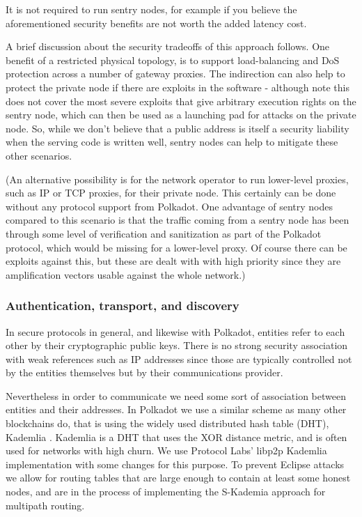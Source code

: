 It is not required to run sentry nodes, for example if you believe the
aforementioned security benefits are not worth the added latency cost.

A brief discussion about the security tradeoffs of this approach follows. One
benefit of a restricted physical topology, is to support load-balancing and DoS
protection across a number of gateway proxies. The indirection can also help to
protect the private node if there are exploits in the software - although note
this does not cover the most severe exploits that give arbitrary execution
rights on the sentry node, which can then be used as a launching pad for
attacks on the private node. So, while we don't believe that a public address
is itself a security liability when the serving code is written well, sentry
nodes can help to mitigate these other scenarios.

(An alternative possibility is for the network operator to run lower-level
proxies, such as IP or TCP proxies, for their private node. This certainly can
be done without any protocol support from Polkadot. One advantage of sentry
nodes compared to this scenario is that the traffic coming from a sentry node
has been through some level of verification and sanitization as part of the
Polkadot protocol, which would be missing for a lower-level proxy. Of course
there can be exploits against this, but these are dealt with with high priority
since they are amplification vectors usable against the whole network.)

\subsubsection{Authentication, transport, and discovery} \label{sec:net_lowlevel}

In secure protocols in general, and likewise with Polkadot, entities refer to each other by their cryptographic public keys. There is no strong security association with weak references such as IP addresses since those are typically controlled not by the entities themselves but by their communications provider.

Nevertheless in order to communicate we need some sort of association between entities and their addresses. In Polkadot we use a similar scheme as many other blockchains do, that is using the widely used distributed hash table (DHT), Kademlia \cite{Maymounkov:2002:Kademila}. Kademlia is a DHT that uses the XOR distance metric, and is often used for networks with high churn. We use Protocol Labs' libp2p Kademlia implementation with some changes for this purpose. To prevent Eclipse attacks \cite{eclipseattack} we allow for routing tables that are large enough to contain at least some honest nodes, and are in the process of implementing the S-Kademia approach for multipath routing.

